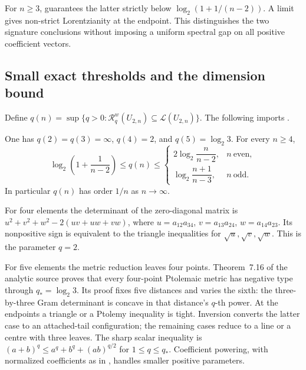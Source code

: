 For $n\geq3$, \cite[Theorem~3.6]{FaverEtAl14RoundnessPublished} guarantees
the latter strictly below $\log_2(1+1/(n-2))$. A limit gives
non-strict Lorentzianity at the endpoint. This distinguishes
the two signature conclusions without imposing a uniform
spectral gap on all positive coefficient vectors.

\subsection{Small exact thresholds and the dimension bound}
\label{sec:appH-triangular-thresholds}

Define $q(n)=\sup\{q>0:\mathcal R_q^w(U_{2,n})\subseteq
\mathcal L(U_{2,n})\}$. The following imports
\cite[Theorems~4.3 and~6.1, Corollary~7.17]{BakerHuhKummerLorscheid26AnalyticV2}.

\begin{theorem}
\label{thm:appH-triangular-rank-two-thresholds}
One has $q(2)=q(3)=\infty$, $q(4)=2$, and $q(5)=\log_2 3$.
For every $n\geq4$,
\begin{equation*}
 \log_2\left(1+\frac1{n-2}\right)\leq q(n)\leq
 \begin{cases}
 2\log_2\dfrac{n}{n-2},&n\ \text{even},\\
 \log_2\dfrac{n+1}{n-3},&n\ \text{odd}.
 \end{cases}
 \tag{H.105}\label{eq:appH-triangular-rank-two-bounds}
\end{equation*}
In particular $q(n)$ has order $1/n$ as $n\to\infty$.
\end{theorem}

For four elements the determinant of the zero-diagonal matrix
is $u^2+v^2+w^2-2(uv+uw+vw)$, where
$u=a_{12}a_{34}$, $v=a_{13}a_{24}$, $w=a_{14}a_{23}$.
Its nonpositive sign is equivalent to the triangle inequalities
for $\sqrt u,\sqrt v,\sqrt w$. This is the parameter $q=2$.

For five elements the metric reduction leaves four points.
Theorem~7.16 of the analytic source proves that every
four-point Ptolemaic metric has negative type through
$q_* =\log_2 3$. Its proof fixes five distances and varies
the sixth: the three-by-three Gram determinant is concave
in that distance's $q$-th power. At the endpoints a triangle
or a Ptolemy inequality is tight. Inversion converts the
latter case to an attached-tail configuration; the remaining
cases reduce to a line or a centre with three leaves.
The sharp scalar inequality is
$(a+b)^q\leq a^q+b^q+(ab)^{q/2}$ for $1\leq q\leq q_*$.
Coefficient powering, with normalized coefficients as in
\cite[Proposition~3.25]{BrandenHuh20Lorentzian}, handles
smaller positive parameters.

